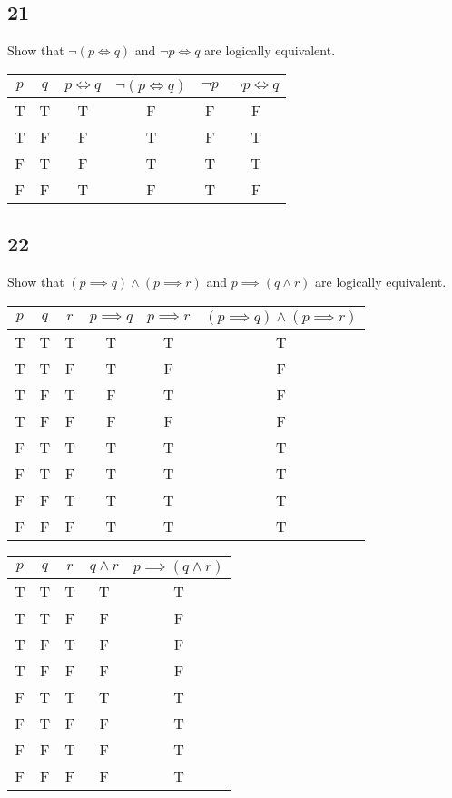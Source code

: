 \documentclass{article}
\begin{document}
\subsection{21}

Show that $ \neg ( p \iff q ) $ and $ \neg p \iff q $ are logically equivalent.

\begin{tabular}{ | c | c | c | c | c | c | }
	$ p $ & $ q $ & $ p \iff q $ & $ \neg ( p \iff q ) $ & $ \neg p $ & $ \neg p \iff q $ \\
	\hline
	T & T & T & F & F & F \\
	T & F & F & T & F & T \\
	F & T & F & T & T & T \\
	F & F & T & F & T & F
\end{tabular}

\subsection{22}

Show that $ ( p \implies q ) \land ( p \implies r ) $ and $ p \implies ( q \land r ) $ are logically equivalent.

\begin{tabular}{ | c | c | c | c | c | c | }
	$ p $ & $ q $ & $ r $ & $ p \implies q $ & $ p \implies r $ & $ ( p \implies q ) \land ( p \implies r ) $ \\
	\hline
	T & T & T & T & T & T \\
	T & T & F & T & F & F \\
	T & F & T & F & T & F \\
	T & F & F & F & F & F \\
	F & T & T & T & T & T \\
	F & T & F & T & T & T \\
	F & F & T & T & T & T \\
	F & F & F & T & T & T \\
\end{tabular}

\begin{tabular}{ | c | c | c | c | c | }
	$ p $ & $ q $ & $ r $ & $ q \land r $ & $ p \implies ( q \land r ) $ \\
	\hline
	T & T & T & T & T \\
	T & T & F & F & F \\
	T & F & T & F & F \\
	T & F & F & F & F \\
	F & T & T & T & T \\
	F & T & F & F & T \\
	F & F & T & F & T \\
	F & F & F & F & T \\
\end{tabular}
\end{document}

